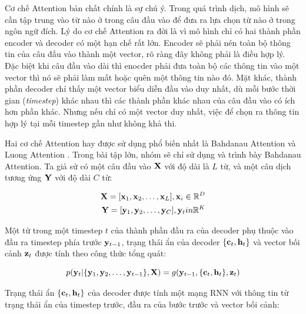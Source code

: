 \documentclass[14pt, a4paper]{article}
\numberwithin{equation}{section}
\numberwithin{algorithm}{section}
\numberwithin{figure}{section}
\numberwithin{dl}{section}
\numberwithin{md}{section}
\numberwithin{bd}{section}
\numberwithin{dn}{section}
\numberwithin{hq}{section}
\begin{document}
    Cơ chế Attention bản chất chính là sự chú ý. Trong quá trình dịch, mô hình sẽ cần tập trung vào từ nào ở trong câu đầu vào để đưa ra lựa chọn từ nào ở trong ngôn ngữ đích.
    Lý do cơ chế Attention ra đời là vì mô hình chỉ có hai thành phần encoder và decoder có một hạn chế rất lớn. Encoder sẽ phải nén toàn bộ thông tin của câu đầu vào thành một vector, rõ ràng đây không phải là điều hợp lý.
    Đặc biệt khi câu đầu vào dài thì enocder phải đưa toàn bộ các thông tin vào một vector thì nó sẽ phải làm mất hoặc quên một thông tin nào đó.
    Mặt khác, thành phần decoder chỉ thấy một vector biểu diễn đầu vào duy nhất, dù mỗi bước thời gian (\textit{timestep}) khác nhau thì các thành phần khác nhau của câu đầu vào có ích hơn phần khác.
    Nhưng nếu chỉ có một vector duy nhất, việc để chọn ra thông tin hợp lý tại mỗi timestep gần như không khả thi.

    Hai cơ chế Attention hay được sử dụng phổ biến nhất là Bahdanau Attention \cite{bahdanau2014neural} và Luong Attention \cite{luong2014addressing}. Trong bài tập lớn, nhóm sẽ chỉ sử dụng và trình bày Bahdanau Attention.
    Ta giả sử có một câu đầu vào $\bold{X}$ với độ dài là $L$ từ, và một câu dịch tương ứng $\bold{Y}$ với độ dài $C$ từ:

    \begin{equation}
        \begin{aligned}
            \bold{X} = \lbrack \bold{x}_1, \bold{x}_2, \dots, \bold{x}_L \rbrack, \bold{x}_i \in \mathbb{R}^D \\
            \bold{Y} = \lbrack \bold{y}_1, \bold{y}_2, \dots, \bold{y}_C \rbrack, \bold{y}_t in \mathbb{R}^K
        \end{aligned}
    \end{equation}

    Một từ trong một timestep $t$ của thành phần đầu ra của decoder phụ thuộc vào đầu ra timestep phía trước $\bold{y}_{t-1}$, trạng thái ẩn của decoder $\lbrace \bold{c}_t, \bold{h}_t \rbrace$ và vector bối cảnh $\bold{z}_t$ được tính theo công thức tổng quát:

    \begin{equation}
        p(\bold{y}_t \vert \lbrace \bold{y}_1, \bold{y}_2, \dots, \bold{y}_{t-1} \rbrace, \bold{X}) = g(\bold{y}_{t-1}, \lbrace \bold{c}_t, \bold{h}_t \rbrace, \bold{z}_t)
    \end{equation}

    Trạng thái ẩn $\lbrace \bold{c}_t, \bold{h}_t \rbrace$ của decoder được tính một mạng RNN với thông tin từ trạng thái ẩn của timestep trước, đầu ra của bước trước và vector bối cảnh:
    
\end{document}
